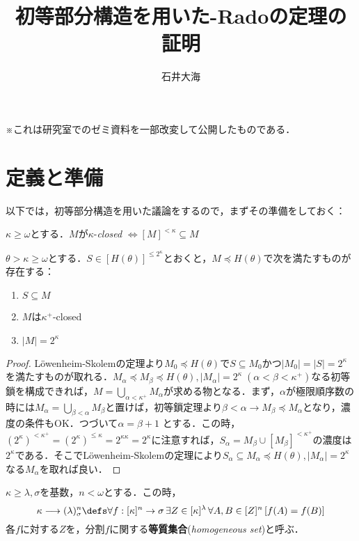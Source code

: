 \documentclass[a4j,lualatex,ja=standard]{bxjsarticle}
\title{初等部分構造を用いた\Erdos-Radoの定理の証明}
\author{石井大海}
\begin{document}
\maketitle

※これは研究室でのゼミ資料を一部改変して公開したものである．
\section{定義と準備}
以下では，初等部分構造を用いた議論をするので，まずその準備をしておく：
\begin{definition}
 $\kappa \geq \omega$とする．$M$が$\kappa$-{\itshape closed} $\Leftrightarrow [M]^{<\kappa} \subseteq M$
\end{definition}

\begin{lemma}\label{lem:LS-generalized}
 $\theta > \kappa \geq \omega$とする．$S \in [H(\theta)]^{\leq 2^\kappa}$とおくと，$M \preccurlyeq H(\theta)$で次を満たすものが存在する：
 \begin{enumerate}
  \item $S \subseteq M$
  \item $M$は$\kappa^+$-closed
  \item $|M| = 2^\kappa$
 \end{enumerate}
\end{lemma}
\begin{proof}
 L\"{o}wenheim-Skolemの定理より$M_0 \preccurlyeq H(\theta)$で$S \subseteq M_0$かつ$|M_0| = |S| = 2^\kappa$を満たすものが取れる．$M_\alpha \preccurlyeq M_\beta \preccurlyeq H(\theta), |M_\alpha| = 2^\kappa\; (\alpha < \beta < \kappa^+)$なる初等鎖を構成できれば，$M = \bigcup_{\alpha < \kappa^+} M_\alpha$が求める物となる．まず，$\alpha$が極限順序数の時には$M_\alpha = \bigcup_{\beta < \alpha} M_\beta$と置けば，初等鎖定理より$\beta < \alpha \rightarrow M_\beta \preccurlyeq M_\alpha$となり，濃度の条件もOK．つづいて$\alpha = \beta + 1$ とする．この時，$(2^{\kappa})^{<\kappa^+} =(2^\kappa)^{\leq \kappa} = 2^{\kappa \kappa} = 2^\kappa$に注意すれば，$S_\alpha = M_\beta \cup [M_\beta]^{<\kappa^+}$の濃度は$2^\kappa$である．そこでL\"{o}wenheim-Skolemの定理により$S_\alpha \subseteq M_\alpha \preccurlyeq H(\theta), |M_\alpha| = 2^\kappa$なる$M_\alpha$を取れば良い．\mbox{}
\end{proof}
\begin{definition}
 $\kappa \geq \lambda, \sigma$を基数，$n<\omega$とする．この時，
 \[
 \kappa \longrightarrow (\lambda)^n_\sigma
 \defs \forall f: [\kappa]^n \to \sigma\, \exists Z \in [\kappa]^\lambda\, \forall A, B \in [Z]^n \left[ f(A) = f(B)\right]
 \]
 各$f$に対する$Z$を，分割$f$に関する{\bfseries 等質集合}({\itshape homogeneous set})と呼ぶ．
\end{definition}
\end{document}
